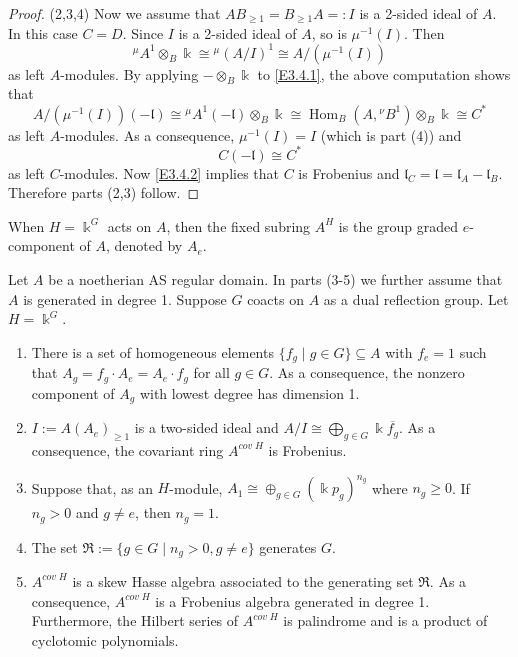 \begin{proof}
(2,3,4)
Now we assume that $AB_{\geq 1}=B_{\geq 1}A=:I$ is a 2-sided 
ideal of $A$. In this case $C=D$.
Since $I$ is a 2-sided ideal of $A$, so is 
$\mu^{-1}(I)$. Then 
$${^\mu A^1}\otimes_B \Bbbk \cong {^\mu (A/I)^1}\cong A/(\mu^{-1}(I))$$
as left $A$-modules. By applying $-\otimes_B \Bbbk$ to \eqref{E3.4.1}, the 
above computation shows that
$$A/(\mu^{-1}(I))(-{\mathfrak l})
\cong {^\mu A^1}(-{\mathfrak l})\otimes_B \Bbbk
\cong \operatorname{Hom}_B(A, {^\nu B^1})\otimes_B \Bbbk
\cong C^*$$
as left $A$-modules. As a consequence, $\mu^{-1}(I)=I$ (which is 
part (4)) and 
\begin{equation}
\label{E3.4.2}\tag{E3.4.2}
C(-{\mathfrak l})\cong C^*
\end{equation}
as left $C$-modules. Now \eqref{E3.4.2} implies that
$C$ is Frobenius and ${\mathfrak l}_C={\mathfrak l}={\mathfrak l}_A-{\mathfrak l}_B$. Therefore
parts (2,3) follow.
\end{proof}

When $H=\Bbbk^G$ acts on $A$, then the
fixed subring $A^H$ is the group graded $e$-component of $A$, denoted by
$A_e$.

\begin{theorem}
\label{xxthm3.5} Let $A$ be a noetherian AS regular domain.
In parts {\rm{(3-5)}} we further assume that $A$ is generated in 
degree 1. Suppose $G$ coacts on $A$ as a dual reflection group.
Let $H=\Bbbk^G$. 
\begin{enumerate}
\item[(1)]
There is a set of homogeneous elements $\{ f_{g}\mid g\in G\}\subseteq A$ 
with $f_e=1$ such that $A_g=f_g \cdot A_e=A_e \cdot f_g$ for all $g\in G$. 
As a consequence, the nonzero component of $A_g$ with lowest degree 
has dimension 1.
\item[(2)]
$I:=A (A_e)_{\geq 1}$ is a two-sided ideal and $A/I\cong \bigoplus_{g\in G} 
\Bbbk \overline{f_g}$. As a consequence, the covariant ring $A^{cov\; H}$ is
Frobenius.
\item[(3)]
Suppose that, as an $H$-module, $A_1\cong
\oplus_{g\in G} (\Bbbk p_g)^{n_g}$ where $n_g\geq 0$. If $n_g>0$
and $g\neq e$, then $n_g=1$.
\item[(4)] 
The set $\Re:=\{g\in G\mid n_g>0, g\neq e\}$ generates $G$. 
\item[(5)]
$A^{cov\; H}$ is a skew Hasse algebra associated to the generating set $\Re$.
As a consequence, $A^{cov\; H}$ is a Frobenius algebra 
generated in degree 1. Furthermore, the Hilbert series of
$A^{cov\; H}$ is palindrome and is a product of cyclotomic
polynomials.
\end{enumerate}
\end{theorem}

